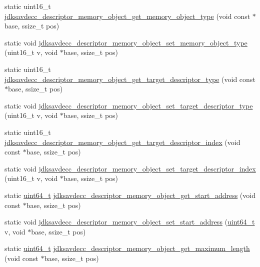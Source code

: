 \begin{DoxyCompactItemize}
static uint16\+\_\+t \hyperlink{group__descriptor__memory__object_ga55cc834cf0e4b3835344973adadbd668}{jdksavdecc\+\_\+descriptor\+\_\+memory\+\_\+object\+\_\+get\+\_\+memory\+\_\+object\+\_\+type} (void const $\ast$base, ssize\+\_\+t pos)
\item 
static void \hyperlink{group__descriptor__memory__object_gae9ccd421c27066b3f53be942176f5f34}{jdksavdecc\+\_\+descriptor\+\_\+memory\+\_\+object\+\_\+set\+\_\+memory\+\_\+object\+\_\+type} (uint16\+\_\+t v, void $\ast$base, ssize\+\_\+t pos)
\item 
static uint16\+\_\+t \hyperlink{group__descriptor__memory__object_gadbecbf3e61d3e7b8c8380c93ac5d5bc9}{jdksavdecc\+\_\+descriptor\+\_\+memory\+\_\+object\+\_\+get\+\_\+target\+\_\+descriptor\+\_\+type} (void const $\ast$base, ssize\+\_\+t pos)
\item 
static void \hyperlink{group__descriptor__memory__object_ga33a14df7c510d98ccc8871645eecc484}{jdksavdecc\+\_\+descriptor\+\_\+memory\+\_\+object\+\_\+set\+\_\+target\+\_\+descriptor\+\_\+type} (uint16\+\_\+t v, void $\ast$base, ssize\+\_\+t pos)
\item 
static uint16\+\_\+t \hyperlink{group__descriptor__memory__object_ga5e6b54bc54bcb9710c1b6207859f32cc}{jdksavdecc\+\_\+descriptor\+\_\+memory\+\_\+object\+\_\+get\+\_\+target\+\_\+descriptor\+\_\+index} (void const $\ast$base, ssize\+\_\+t pos)
\item 
static void \hyperlink{group__descriptor__memory__object_ga4144e5cb684be55ede23408f10394b96}{jdksavdecc\+\_\+descriptor\+\_\+memory\+\_\+object\+\_\+set\+\_\+target\+\_\+descriptor\+\_\+index} (uint16\+\_\+t v, void $\ast$base, ssize\+\_\+t pos)
\item 
static \hyperlink{parse_8c_aec6fcb673ff035718c238c8c9d544c47}{uint64\+\_\+t} \hyperlink{group__descriptor__memory__object_ga282dc0761ca0dd00fb26cdab52d2bd24}{jdksavdecc\+\_\+descriptor\+\_\+memory\+\_\+object\+\_\+get\+\_\+start\+\_\+address} (void const $\ast$base, ssize\+\_\+t pos)
\item 
static void \hyperlink{group__descriptor__memory__object_ga7c9c1ec01466d6586f71b6a8b0a7d9f8}{jdksavdecc\+\_\+descriptor\+\_\+memory\+\_\+object\+\_\+set\+\_\+start\+\_\+address} (\hyperlink{parse_8c_aec6fcb673ff035718c238c8c9d544c47}{uint64\+\_\+t} v, void $\ast$base, ssize\+\_\+t pos)
\item 
static \hyperlink{parse_8c_aec6fcb673ff035718c238c8c9d544c47}{uint64\+\_\+t} \hyperlink{group__descriptor__memory__object_ga95fdaeb40e9131d32a2f1c735e7eaf54}{jdksavdecc\+\_\+descriptor\+\_\+memory\+\_\+object\+\_\+get\+\_\+maximum\+\_\+length} (void const $\ast$base, ssize\+\_\+t pos)

\end{DoxyCompactItemize}
